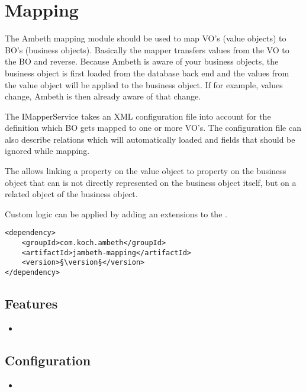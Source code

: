 \section{Mapping}
\label{module:Mapping}
\ClearAPI
\TODO The Ambeth mapping module should be used to map VO's (value objects) to BO's (business objects). Basically the mapper transfers values from the VO to the BO and reverse. Because Ambeth is aware of your business objects, the business object is first loaded from the database back end and the values from the value object will be applied to the business object. If for example, values change, Ambeth is then already aware of that change. 

The IMapperService takes an XML configuration file into account for the definition which BO gets mapped to one or more VO's. The configuration file can also describe relations which will automatically loaded and fields that should be ignored while mapping.

The  allows linking a property on the value object to property on the business object that can is not directly represented on the business object itself, but on a related object of the business object. 

Custom logic can be applied by adding an extensions to the .


\begin{lstlisting}[style=POM,caption={Maven modules to use \emph{Ambeth Mapping}}]
<dependency>
	<groupId>com.koch.ambeth</groupId>
	<artifactId>jambeth-mapping</artifactId>
	<version>§\version§</version>
</dependency>
\end{lstlisting}
\subsection{Features}
\begin{itemize}
	\item \TODO
\end{itemize}

\subsection{Configuration}
\begin{itemize}
	\item {}
\end{itemize}
